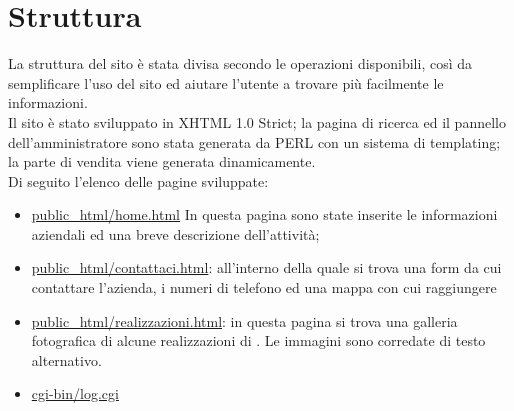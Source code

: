 \section{Struttura}{
	La struttura del sito è stata divisa secondo le operazioni disponibili, così da semplificare l'uso del sito ed aiutare l'utente a trovare più facilmente le informazioni.
	\\
	Il sito è stato sviluppato in XHTML 1.0 Strict; la pagina di ricerca ed il pannello dell'amministratore sono stata generata da PERL con un sistema di templating; la parte di vendita viene generata dinamicamente.
	\\
	Di seguito l'elenco delle pagine sviluppate:
	\begin{itemize}
		\item \url{ public_html/home.html} In questa pagina sono state inserite le informazioni aziendali ed una breve descrizione dell'attività; 
		\item \url{public_html/contattaci.html}: all'interno della quale si trova una form da cui contattare l'azienda, i numeri di telefono ed una mappa con cui raggiungere \textbf{\ggt} 
		\item \url{public_html/realizzazioni.html}: in questa pagina si trova una galleria fotografica di alcune realizzazioni di \textbf{\ggt}. Le immagini sono corredate di testo alternativo.
		\item \url{cgi-bin/log.cgi} 
	\end{itemize}
}
